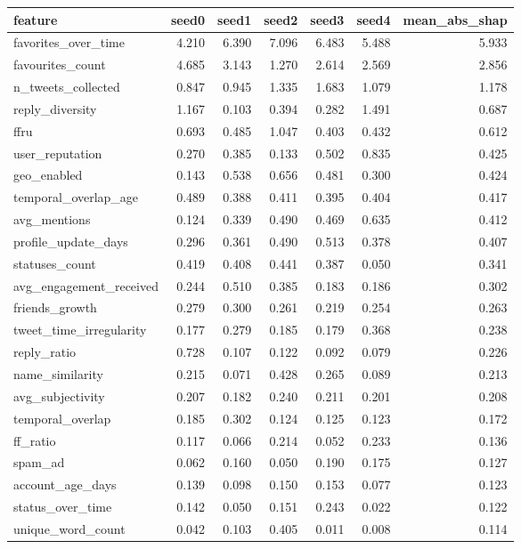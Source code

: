 \begin{tabular}{lrrrrrr}
\toprule
feature & seed0 & seed1 & seed2 & seed3 & seed4 & mean_abs_shap \\
\midrule
favorites_over_time & 4.210 & 6.390 & 7.096 & 6.483 & 5.488 & 5.933 \\
favourites_count & 4.685 & 3.143 & 1.270 & 2.614 & 2.569 & 2.856 \\
n_tweets_collected & 0.847 & 0.945 & 1.335 & 1.683 & 1.079 & 1.178 \\
reply_diversity & 1.167 & 0.103 & 0.394 & 0.282 & 1.491 & 0.687 \\
ffru & 0.693 & 0.485 & 1.047 & 0.403 & 0.432 & 0.612 \\
user_reputation & 0.270 & 0.385 & 0.133 & 0.502 & 0.835 & 0.425 \\
geo_enabled & 0.143 & 0.538 & 0.656 & 0.481 & 0.300 & 0.424 \\
temporal_overlap_age & 0.489 & 0.388 & 0.411 & 0.395 & 0.404 & 0.417 \\
avg_mentions & 0.124 & 0.339 & 0.490 & 0.469 & 0.635 & 0.412 \\
profile_update_days & 0.296 & 0.361 & 0.490 & 0.513 & 0.378 & 0.407 \\
statuses_count & 0.419 & 0.408 & 0.441 & 0.387 & 0.050 & 0.341 \\
avg_engagement_received & 0.244 & 0.510 & 0.385 & 0.183 & 0.186 & 0.302 \\
friends_growth & 0.279 & 0.300 & 0.261 & 0.219 & 0.254 & 0.263 \\
tweet_time_irregularity & 0.177 & 0.279 & 0.185 & 0.179 & 0.368 & 0.238 \\
reply_ratio & 0.728 & 0.107 & 0.122 & 0.092 & 0.079 & 0.226 \\
name_similarity & 0.215 & 0.071 & 0.428 & 0.265 & 0.089 & 0.213 \\
avg_subjectivity & 0.207 & 0.182 & 0.240 & 0.211 & 0.201 & 0.208 \\
temporal_overlap & 0.185 & 0.302 & 0.124 & 0.125 & 0.123 & 0.172 \\
ff_ratio & 0.117 & 0.066 & 0.214 & 0.052 & 0.233 & 0.136 \\
spam_ad & 0.062 & 0.160 & 0.050 & 0.190 & 0.175 & 0.127 \\
account_age_days & 0.139 & 0.098 & 0.150 & 0.153 & 0.077 & 0.123 \\
status_over_time & 0.142 & 0.050 & 0.151 & 0.243 & 0.022 & 0.122 \\
unique_word_count & 0.042 & 0.103 & 0.405 & 0.011 & 0.008 & 0.114 \\

\end{tabular}
